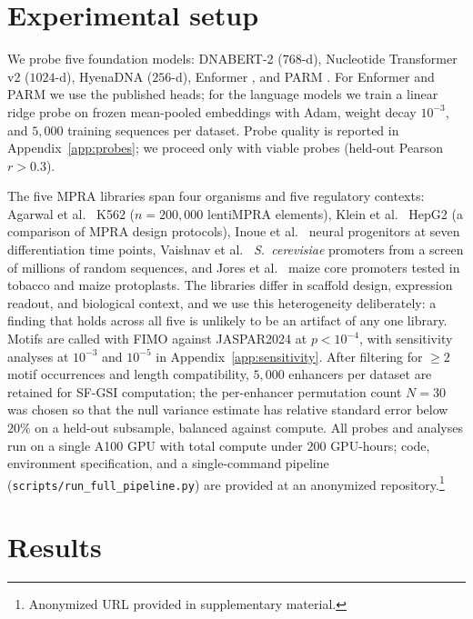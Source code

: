 \documentclass{article}
\begin{document}
\section{Experimental setup}
\label{sec:setup}

We probe five foundation models: DNABERT-2 \citep{zhou2023dnabert2} ($768$-d), Nucleotide Transformer v2 \citep{dalla2025nt} ($1024$-d), HyenaDNA \citep{nguyen2023hyenadna} ($256$-d), Enformer \citep{avsec2021enformer}, and PARM \citep{aerts2024parm}. For Enformer and PARM we use the published heads; for the language models we train a linear ridge probe on frozen mean-pooled embeddings with Adam, weight decay $10^{-3}$, and $5{,}000$ training sequences per dataset. Probe quality is reported in Appendix~\ref{app:probes}; we proceed only with viable probes (held-out Pearson $r > 0.3$).

The five MPRA libraries span four organisms and five regulatory contexts: Agarwal et al.\ \citep{agarwal2025} K562 ($n = 200{,}000$ lentiMPRA elements), Klein et al.\ \citep{klein2020} HepG2 (a comparison of MPRA design protocols), Inoue et al.\ \citep{inoue2019} neural progenitors at seven differentiation time points, Vaishnav et al.\ \citep{vaishnav2022} \emph{S.\ cerevisiae} promoters from a screen of millions of random sequences, and Jores et al.\ \citep{jores2021} maize core promoters tested in tobacco and maize protoplasts. The libraries differ in scaffold design, expression readout, and biological context, and we use this heterogeneity deliberately: a finding that holds across all five is unlikely to be an artifact of any one library. Motifs are called with FIMO \citep{grant2011fimo} against JASPAR2024 \citep{rauluseviciute2024jaspar} at $p < 10^{-4}$, with sensitivity analyses at $10^{-3}$ and $10^{-5}$ in Appendix~\ref{app:sensitivity}. After filtering for $\geq 2$ motif occurrences and length compatibility, $5{,}000$ enhancers per dataset are retained for SF-GSI computation; the per-enhancer permutation count $N=30$ was chosen so that the null variance estimate has relative standard error below $20\%$ on a held-out subsample, balanced against compute. All probes and analyses run on a single A100 GPU with total compute under $200$ GPU-hours; code, environment specification, and a single-command pipeline (\texttt{scripts/run\_full\_pipeline.py}) are provided at an anonymized repository.\footnote{Anonymized URL provided in supplementary material.}

\section{Results}
\label{sec:results}
\end{document}
